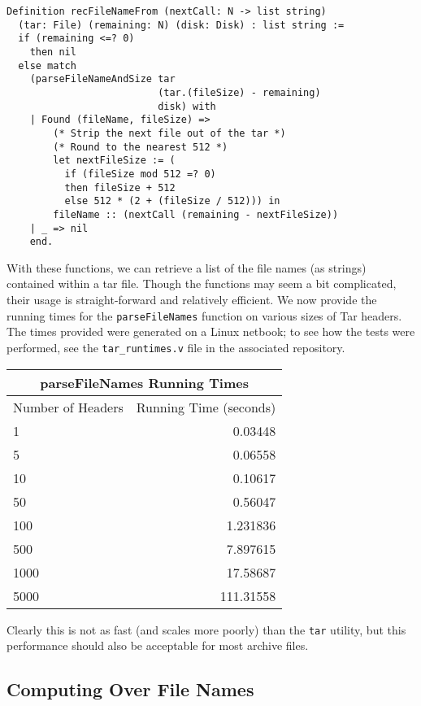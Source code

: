 \documentclass[nocopyrightspace,preprint]{sigplanconf}
\begin{document}
\begin{lstlisting}
Definition recFileNameFrom (nextCall: N -> list string) 
  (tar: File) (remaining: N) (disk: Disk) : list string :=
  if (remaining <=? 0)
    then nil
  else match 
    (parseFileNameAndSize tar 
                          (tar.(fileSize) - remaining) 
                          disk) with
    | Found (fileName, fileSize) =>
        (* Strip the next file out of the tar *)
        (* Round to the nearest 512 *)
        let nextFileSize := (
          if (fileSize mod 512 =? 0)
          then fileSize + 512
          else 512 * (2 + (fileSize / 512))) in
        fileName :: (nextCall (remaining - nextFileSize))
    | _ => nil
    end.
\end{lstlisting}

With these functions, we can retrieve a list of the file names (as strings)
contained within a tar file. Though the functions may seem a bit complicated,
their usage is straight-forward and relatively efficient. We now provide the
running times for the {\tt parseFileNames} function on various sizes of Tar
headers. The times provided were generated on a Linux netbook; to see how the
tests were performed, see the {\tt tar\_runtimes.v} file in the associated
repository.

\begin{center}
  \begin{tabular}{|l|r|}
    \hline
    \multicolumn{2}{|c|}{parseFileNames Running Times}\\
    \hline
    Number of Headers & Running Time (seconds)\\
    \hline
    1 & 0.03448\\
    5 & 0.06558\\
    10 & 0.10617\\
    50 & 0.56047\\
    100 & 1.231836\\
    500 & 7.897615\\
    1000 & 17.58687\\
    5000 & 111.31558\\
    \hline
  \end{tabular}
\end{center}

Clearly this is not as fast (and scales more poorly) than the {\tt tar}
utility, but this performance should also be acceptable for most archive
files.

\subsection{Computing Over File Names}
\end{document}
